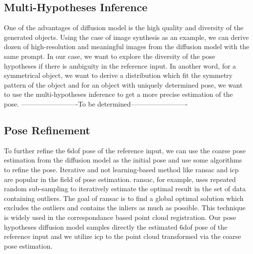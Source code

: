 \documentclass[12pt,DIV14,BCOR12mm,a4paper,footinclude=false,headinclude,parskip=half-,twoside,openright,cleardoublepage=empty,toc=index,bibliography=totoc,listof=totoc]{scrreprt}
\numberwithin{equation}{chapter}
\begin{document}
\subsection{Multi-Hypotheses Inference}
One of the advantages of diffusion model is the high quality and diversity of the generated objects. Using the case of image synthesis as an example, we can derive dozen of high-resolution and meaningful images from the diffusion model with the same prompt. In our case, we want to explore the diversity of the pose hypotheses if there is ambiguity in the reference input. In another word, for a symmetrical object, we want to derive a distribution which fit the symmetry pattern of the object and for an object with uniquely determined pose, we want to use the multi-hypotheses inference to get a more precise estimation of the pose.
-------------------------To be determined-------------------------

\subsection{Pose Refinement}
To further refine the \gls{6dof} pose of the reference input, we can use the coarse pose estimation from the diffusion model as the initial pose and use some algorithms to refine the pose. Iterative and not learning-based method like \gls{ransac} \cite{10.1145/358669.358692} and \gls{icp}\cite{121791} are popular in the field of pose estimation. \gls{ransac}, for example, uses repeated random sub-sampling to iteratively estimate the optimal result in the set of data containing outliers. The goal of \gls{ransac} is to find a global optimal solution which excludes the outliers and contains the inliers as much as possible. This technique is widely used in the correspondance based point cloud registration. Our pose hypotheses diffusion model samples directly the estimated \gls{6dof} pose of the reference input and we utilize \gls{icp} to the point cloud transformed via the coarse pose estimation. 
\end{document}
